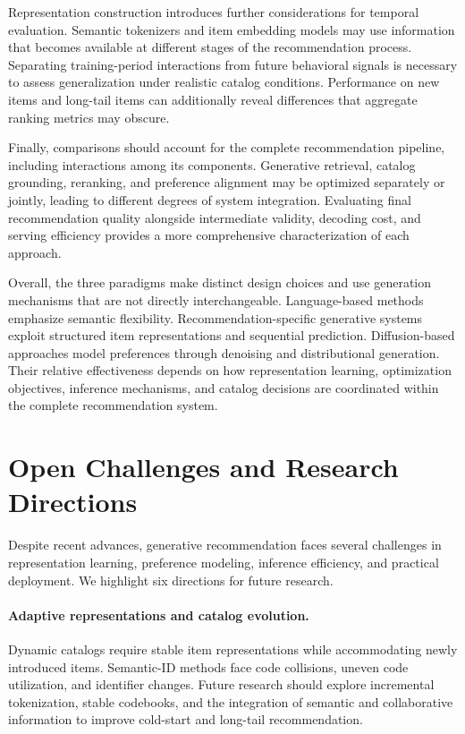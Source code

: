 \documentclass[sigconf,nonacm]{acmart}
\begin{document}
Representation construction introduces further
considerations for temporal evaluation.
Semantic tokenizers and item embedding models
may use information that becomes available
at different stages of the recommendation
process. Separating training-period interactions
from future behavioral signals is necessary
to assess generalization under realistic
catalog conditions. Performance on new items
and long-tail items can additionally reveal
differences that aggregate ranking metrics
may obscure.

Finally, comparisons should account for the
complete recommendation pipeline, including
interactions among its components. Generative retrieval,
catalog grounding, reranking, and preference
alignment may be optimized separately or
jointly, leading to different degrees of
system integration. Evaluating final recommendation
quality alongside intermediate validity,
decoding cost, and serving efficiency provides
a more comprehensive characterization of
each approach.

Overall, the three paradigms make distinct
design choices and use generation mechanisms
that are not directly interchangeable. Language-based methods
emphasize semantic flexibility. Recom\-men\-dation-specific
generative systems exploit structured
item representations and sequential prediction.
Diffusion-based approaches model preferences
through denoising and distributional generation.
Their relative effectiveness depends on how
representation learning, optimization objectives,
inference mechanisms, and catalog decisions
are coordinated within the complete
recommendation system.


\section{Open Challenges and Research Directions}
\label{sec:challenges}

Despite recent advances, generative recommendation faces
several challenges in representation learning, preference
modeling, inference efficiency, and practical deployment.
We highlight six directions for future research.

\paragraph{Adaptive representations and catalog evolution.}
Dynamic catalogs require stable item representations while
accommodating newly introduced items. Semantic-ID methods
face code collisions, uneven code utilization, and
identifier changes. Future research should explore
incremental tokenization, stable codebooks, and the
integration of semantic and collaborative information
to improve cold-start and long-tail recommendation.
\end{document}
